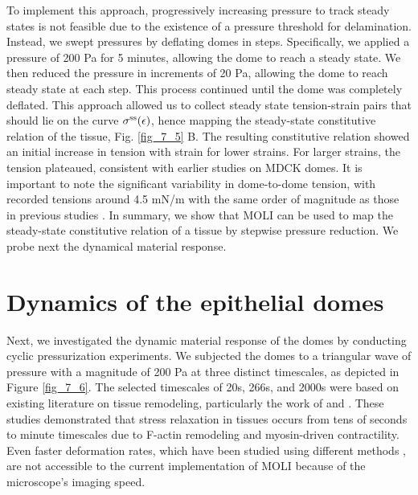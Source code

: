 To implement this approach, progressively increasing pressure to track steady states is not feasible due to the existence of a pressure threshold for delamination. Instead, we swept pressures by deflating domes in steps. Specifically, we applied a pressure of 200 \unit{\pascal} for 5 minutes, allowing the dome to reach a steady state. We then reduced the pressure in increments of 20 \unit{\pascal}, allowing the dome to reach steady state at each step. This process continued until the dome was completely deflated. This approach allowed us to collect steady state tension-strain pairs that should lie on the curve $\sigma^{\rm ss}(\epsilon)$, hence mapping the steady-state constitutive relation of the tissue, Fig. \ref{fig_7_5} B. The resulting constitutive relation showed an initial increase in tension with strain for lower strains. For larger strains, the tension plateaued, consistent with earlier studies on MDCK domes. It is important to note the significant variability in dome-to-dome tension, with recorded tensions around 4.5 \unit{mN/m} with the same order of magnitude as those in previous studies \cite{latorre2018,marin-llaurado2022}. In summary, we show that MOLI can be used to map the steady-state constitutive relation of a tissue by stepwise pressure reduction. We probe next the dynamical material response.

\vspace{0cm}

\hypertarget{dynamics-of-the-epithelia-domes}{\section{Dynamics of the epithelial domes}\label{dynamics-of-the-epithelial-domes}}

Next, we investigated the dynamic material response of the domes by conducting cyclic pressurization experiments. We subjected the domes to a triangular wave of pressure with a magnitude of 200 Pa at three distinct timescales, as depicted in Figure \ref{fig_7_6}. The selected timescales of 20s, 266s, and 2000s were based on existing literature on tissue remodeling, particularly the work of \citet{khalilgharibi2019} and \citet{casares2015}. These studies demonstrated that stress relaxation in tissues occurs from tens of seconds to minute timescales due to F-actin remodeling and myosin-driven contractility. Even faster deformation rates, which have been studied using different methods \cite{khalilgharibi2019}, are not accessible to the current implementation of MOLI because of the microscope’s imaging speed.

